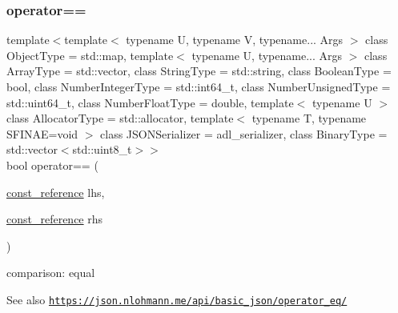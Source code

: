 \subsubsection{\texorpdfstring{operator==}{operator==}\hspace{0.1cm}{\footnotesize\ttfamily [1/3]}}
{\footnotesize\ttfamily template$<$template$<$ typename U, typename V, typename... Args $>$ class Object\+Type = std\+::map, template$<$ typename U, typename... Args $>$ class Array\+Type = std\+::vector, class String\+Type  = std\+::string, class Boolean\+Type  = bool, class Number\+Integer\+Type  = std\+::int64\+\_\+t, class Number\+Unsigned\+Type  = std\+::uint64\+\_\+t, class Number\+Float\+Type  = double, template$<$ typename U $>$ class Allocator\+Type = std\+::allocator, template$<$ typename T, typename S\+F\+I\+N\+A\+E=void $>$ class J\+S\+O\+N\+Serializer = adl\+\_\+serializer, class Binary\+Type  = std\+::vector$<$std\+::uint8\+\_\+t$>$$>$ \\
bool operator== (\begin{DoxyParamCaption}\item[{\hyperlink{classnlohmann_1_1basic__json_ab8a1c33ee7b154fc41ca2545aa9724e6}{const\+\_\+reference}}]{lhs,  }\item[{\hyperlink{classnlohmann_1_1basic__json_ab8a1c33ee7b154fc41ca2545aa9724e6}{const\+\_\+reference}}]{rhs }\end{DoxyParamCaption})\hspace{0.3cm}{\ttfamily [friend]}}



comparison\+: equal 

\begin{DoxySeeAlso}{See also}
\href{https://json.nlohmann.me/api/basic_json/operator_eq/}{\tt https\+://json.\+nlohmann.\+me/api/basic\+\_\+json/operator\+\_\+eq/} 
\end{DoxySeeAlso}
\mbox{\label{classnlohmann_1_1basic__json_a107a085c92ec4e062d1185b2d09c7978}} 
